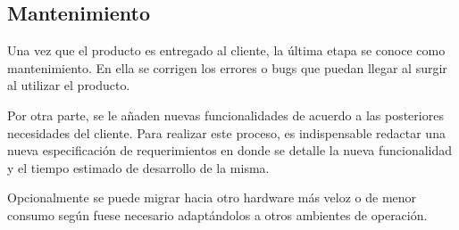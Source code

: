 \subsection{Mantenimiento}
Una vez que el producto es entregado al cliente, la última etapa se conoce como mantenimiento.
En ella se corrigen los errores o bugs que puedan llegar al surgir al utilizar el producto.

Por otra parte, se le añaden nuevas funcionalidades de acuerdo a las posteriores necesidades del cliente.
Para realizar este proceso, es indispensable redactar una nueva especificación de requerimientos en donde se detalle la nueva funcionalidad y el tiempo estimado de desarrollo de la misma.

Opcionalmente se puede migrar hacia otro hardware más veloz o de menor consumo según fuese necesario adaptándolos a otros ambientes de operación.